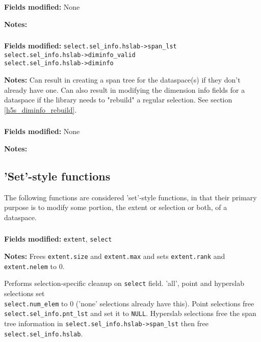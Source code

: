 \documentclass[../HDF5_RFC.tex]{subfiles}
\begin{document}
\subsubsection{}

\textbf{Fields modified:} None

\textbf{Notes:}

\subsubsection{}

\textbf{Fields modified:} \texttt{select.sel\_info.hslab->span\_lst} \\
\texttt{select.sel\_info.hslab->diminfo\_valid} \\
\texttt{select.sel\_info.hslab->diminfo}

\textbf{Notes:} Can result in creating a span tree for the dataspace(s) if they don't already have one.
Can also result in modifying the dimension info fields for a dataspace if the library needs to "rebuild"
a regular selection. See section \ref{h5s_diminfo_rebuild}.

\subsubsection{}

\textbf{Fields modified:} None

\textbf{Notes:}

\subsection{'Set'-style functions}

The following functions are considered 'set'-style functions, in that their primary purpose is
to modify some portion, the extent or selection or both, of a dataspace.

\subsubsection{}

\textbf{Fields modified:} \texttt{extent}, \texttt{select}

\textbf{Notes:} Frees \texttt{extent.size} and \texttt{extent.max} and sets \texttt{extent.rank} and \texttt{extent.nelem} to 0.

Performs selection-specific cleanup on \texttt{select} field. 'all', point and hyperslab selections
set \\
\texttt{select.num\_elem} to 0 ('none' selections already have this). Point selections free \\
\texttt{select.sel\_info.pnt\_lst} and set it to \texttt{NULL}. Hyperslab selections free the span
tree information in \texttt{select.sel\_info.hslab->span\_lst} then free \texttt{select.sel\_info.hslab}.
\end{document}
